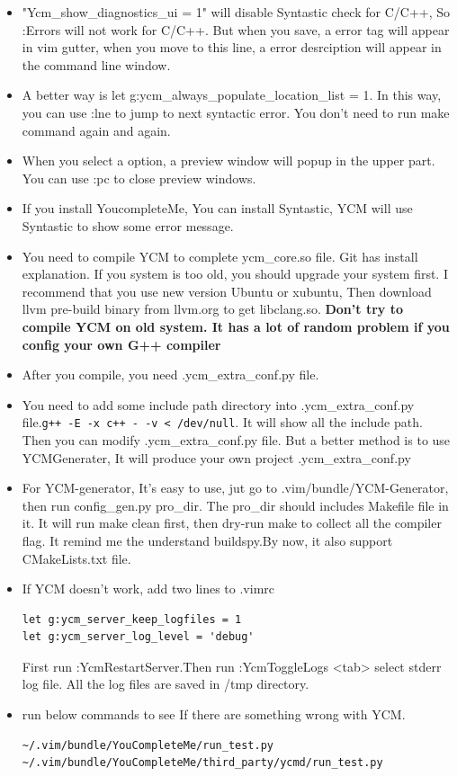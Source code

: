 \documentclass[a4paper,12pt,twoside]{book}
\begin{document}
\begin{itemize}
\item "Ycm\_show\_diagnostics\_ui = 1" will disable Syntastic check for C/C++, So :Errors will not work for C/C++. But when you save, a error tag will appear in vim gutter, when you move to this line, a error desrciption will appear in the command line window. 

		\item A better way is let g:ycm\_always\_populate\_location\_list = 1. In this way, you can use :lne to jump to next syntactic error. You don't need to run make command again and again.
				

\item When you select a option, a preview window will popup in the upper part. You can use :pc to close preview windows.

\item If you install YoucompleteMe, You can install Syntastic, YCM will use Syntastic to show some error message.   

\item You need to compile YCM to complete ycm\_core.so file. Git has install explanation. If you system is too old, you should upgrade your system first. I recommend that you use new version Ubuntu or xubuntu, Then download llvm pre-build binary from llvm.org to get libclang.so. \textbf{Don't try to compile YCM on old system. It has a lot of random problem if you config your own G++ compiler}

\item After you compile, you need .ycm\_extra\_conf.py file. 

\item You need to add some include path directory into .ycm\_extra\_conf.py file.\verb=g++ -E -x c++ - -v < /dev/null=. It will show all the include path. Then you can modify .ycm\_extra\_conf.py file. But a better method is to use YCMGenerater, It will produce your own project .ycm\_extra\_conf.py

\item For YCM-generator, It's easy to use, jut go to .vim/bundle/YCM-Generator, then run config\_gen.py pro\_dir. The pro\_dir should includes Makefile file in it.  It will run make clean first, then dry-run make to collect all the compiler flag. It remind me the understand buildspy.By now, it also support CMakeLists.txt file. 

\item If YCM doesn't work, add two lines to .vimrc 
\begin{verbatim}
let g:ycm_server_keep_logfiles = 1
let g:ycm_server_log_level = 'debug'
\end{verbatim}

First run :YcmRestartServer.Then run :YcmToggleLogs <tab> select stderr log file. All the log files are saved in /tmp directory. 

\item run below commands to see If there are something wrong with YCM. 	
\begin{verbatim}
~/.vim/bundle/YouCompleteMe/run_test.py
~/.vim/bundle/YouCompleteMe/third_party/ycmd/run_test.py
\end{verbatim}
\end{itemize}
\end{document}
